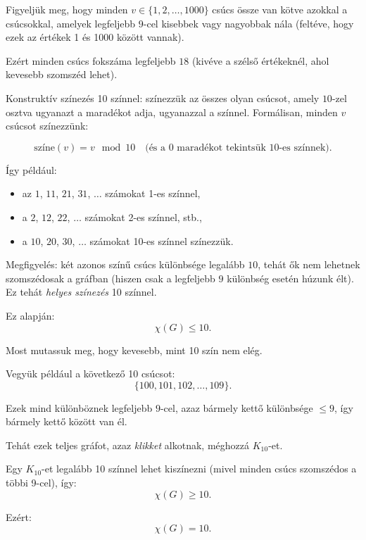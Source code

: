 \begin{solution}
	Figyeljük meg, hogy minden $v\in\{1,2,\dots,1000\}$ csúcs össze van
	kötve azokkal a csúcsokkal, amelyek legfeljebb $9$-cel kisebbek vagy
	nagyobbak nála (feltéve, hogy ezek az értékek 1 és 1000 között vannak).
	
	Ezért minden csúcs fokszáma legfeljebb $18$ (kivéve a szélső értékeknél,
	ahol kevesebb szomszéd lehet).
	
	Konstruktív színezés 10 színnel: színezzük az összes olyan csúcsot,
	amely $10$-zel osztva ugyanazt a maradékot adja, ugyanazzal a színnel.
	Formálisan, minden $v$ csúcsot színezzünk:
	
	\[
	\text{színe}(v)=v\mod 10\quad\text{(és a 0 maradékot tekintsük 10-es színnek)}.
	\]
	
	Így például: 
	\begin{itemize}
		\item az $1$, $11$, $21$, $31$, $\dots$ számokat 1-es színnel, 
		\item a $2$, $12$, $22$, $\dots$ számokat 2-es színnel, stb., 
		\item a $10$, $20$, $30$, $\dots$ számokat 10-es színnel színezzük. 
	\end{itemize}
	Megfigyelés: két azonos színű csúcs különbsége legalább $10$, tehát
	ők nem lehetnek szomszédosak a gráfban (hiszen csak a legfeljebb $9$
	különbség esetén húzunk élt). Ez tehát \emph{helyes színezés} 10 színnel.
	
	Ez alapján: 
	\[
	\chi(G)\leq10.
	\]
	
	Most mutassuk meg, hogy kevesebb, mint 10 szín nem elég.
	
	Vegyük például a következő 10 csúcsot: 
	\[
	\{100,101,102,\dots,109\}.
	\]
	
	Ezek mind különböznek legfeljebb $9$-cel, azaz bármely kettő különbsége
	$\leq9$, így bármely kettő között van él.
	
	Tehát ezek teljes gráfot, azaz \emph{klikket} alkotnak, méghozzá $K_{10}$-et.
	
	Egy $K_{10}$-et legalább 10 színnel lehet kiszínezni (mivel minden
	csúcs szomszédos a többi 9-cel), így: 
	\[
	\chi(G)\geq10.
	\]
	
	Ezért: 
	\[
	\chi(G)=10.
	\]
\end{solution}
